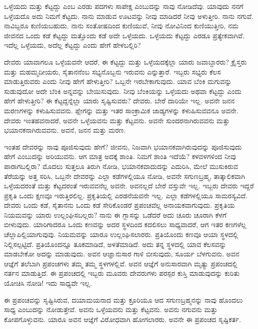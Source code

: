 ಒಳ್ಳೆಯದು ಮತ್ತು ಕೆಟ್ಟದ್ದು ಎಂಬ ಎರಡು ಪದಗಳು ಸಾಪೇಕ್ಷ ಎಂಬುದನ್ನು ನಾವು ನೋಡಿದೆವು. ಯಾವುದು ನನಗೆ ಒಳ್ಳೆಯದೊ ಅದು ನಿಮಗೆ ಕೆಟ್ಟದು. ನಾನು ಮಾಡುವ ಊಟವನ್ನು ನೀವು ಮಾಡಿದರೆ ನೀವು ಅಳುತ್ತೀರಿ. ನಾನು ನಗುವೆ. ನಾವಿಬ್ಬರೂ ಕುಣಿಯಬಹುದು. ನಾನು ಸಂತೋಷದಿಂದ ಕುಣಿಯುವೆ, ನೀವು ನೋವಿನಿಂದ ಕುಣಿಯುತ್ತೀರಿ, ನಮ ಜೀವನದ ಒಂದು ಕಡೆ ಕೆಟ್ಟದ್ದು ಮತ್ತೊಂದು ಕಡೆ ಅದೇ ಒಳ್ಳೆಯದು. ಒಳ್ಳೆಯದು ಕೆಟ್ಟದ್ದು ಎರಡೂ ಪ್ರತ್ಯೇಕವಾಗಿವೆ. ಇದೆಲ್ಲ ಒಳ್ಳೆಯದು, ಅದೆಲ್ಲ ಕೆಟ್ಟದ್ದು ಎಂದು ಹೇಗೆ ಹೇಳಬಲ್ಲಿರಿ?

ದೇವರು ಯಾವಾಗಲೂ ಒಳ್ಳೆಯವನೇ ಆದರೆ, ಈ ಕೆಟ್ಟದ್ದು ಮತ್ತು ಒಳ್ಳೆಯದಕ್ಕೆಲ್ಲಾ ಯಾರು ಜವಾಬ್ದಾರರು? ಕ್ರೈಸ್ತರು ಮತ್ತು ಮಹಮ್ಮದೀಯರು, ಸೈತಾನನೆಂಬ ಸಭ್ಯನೊಬ್ಬನು ಇರುವನು ಎನ್ನುತ್ತಾರೆ. ಇಬ್ಬರು ಸಭ್ಯರು ಕೆಲಸ ಮಾಡುತ್ತಿರುವರು ಎಂದು ನೀವು ಹೇಗೆ ಹೇಳುತ್ತೀರಿ? ಒಬ್ಬನೇ ಇರಬೇಕಾಗುವುದು. ಯಾವ ಬೆಂಕಿ ಮಗುವನ್ನು ಸುಡುವುದೋ ಅದೇ ಬೆಂಕಿ ಅನ್ನವನ್ನು ಬೇಯಿಸುವುದು. ನೀವು ಬೆಂಕಿಯನ್ನು ಒಳ್ಳೆಯದು ಅಥವಾ ಕೆಟ್ಟದ್ದು ಎಂದು ಹೇಗೆ ಹೇಳುತ್ತೀರಿ? ಈ ಕೆಟ್ಟದ್ದನ್ನೆಲ್ಲಾ ಯಾರು ಸೃಷ್ಟಿಸುವರು? ದೇವರು. ಬೇರೆ ದಾರಿಯೇ ಇಲ್ಲ. ಅವನೇ ಜನನ ಮರಣಗಳನ್ನು ಕಳುಹಿಸುವವನು. ಪ್ಲೇಗನ್ನು ಮತ್ತು ಇತರ ಸಾಂಕ್ರಾಮಿಕ ಜಾಡ್ಯಗಳನ್ನು ಕಳುಹಿಸುವವನೂ ಅವನೇ. ದೇವರು ಇಂತಹವನಾದರೆ, ಅವನೇ ಒಳ್ಳೆಯವನು ಮತ್ತು ಕೆಟ್ಟವನು. ಅವನೇ ಸುಂದರನಾಗಿರುವವನು ಮತ್ತು ಭಯಾನಕನಾಗಿರುವವನು. ಅವನೆ, ಜನನ ಮತ್ತು ಮರಣ.

ಇಂತಹ ದೇವರನ್ನು ನಾವು ಪೂಜಿಸುವುದು ಹೇಗೆ? ಜೀವನು, ನಿಜವಾಗಿ ಭಯಾನಕವಾಗಿರುವುದನ್ನು ಪೂಜಿಸುವುದು ಹೇಗೆ ಎಂಬುದನ್ನು ಅರಿಯುವನು. ಆಗ ಮಾತ್ರ ಅದಕ್ಕೆ ಶಾಂತಿ. ನಿಮಗೆ ಶಾಂತಿ ಇದೆಯೆ? ಕಳವಳಗಳಿಂದ ನೀವು ಪಾರಾಗಬಲ್ಲಿರಾ? ಮೊದಲು ಸುತ್ತಲೂ ತಿರುಗಿ ನೋಡಿ, ಭಯಾನಕವಾದುದನ್ನು ಎದುರಿಸಿ, ಮೇಲೆ ಮುಸುಕಿರುವ ತೆರೆಯನ್ನು ಅತ್ತ ಸರಿಸಿ, ಒಬ್ಬನೇ ದೇವರನ್ನು ಎಲ್ಲಾ ಕಡೆಗಳಲ್ಲಿಯೂ ನೋಡಿ, ಅವನೇ ಸಗುಣಬ್ರಹ್ಮ, ತಾತ್ಕಾಲಿಕವಾಗಿ ಒಳ್ಳೆಯದರಂತೆ ಮತ್ತು ಕೆಟ್ಟದರಂತೆ ಇರುವವನೆಲ್ಲ ಅವನೇ. ಅವನಲ್ಲದೆ ಬೇರೆ ವಸ್ತುವೇ ಇಲ್ಲ. ಇಬ್ಬರು ದೇವರು ಇದ್ದರೆ ಪ್ರಕೃತಿ ಒಂದು ಕ್ಷಣವೂ ಇರುತ್ತಿರಲಿಲ್ಲ. ಪ್ರಕೃತಿಯಲ್ಲಿ ಎರಡನೆಯವನೇ ಇಲ್ಲ. ಎಲ್ಲಾ ಕಡೆಗಳಲ್ಲಿಯೂ ಸಾಮರಸ್ಯವಿದೆ. ದೇವರು ಒಂದು ಕಡೆ, ಸೈತಾನನು ಒಂದು ಕಡೆ ಸೇರಿಕೊಂಡರೆ ಪ್ರಪಂಚವೆಲ್ಲ ಅನಾಯಕವಾಗುವುದು. ಪ್ರಕೃತಿಯ ನಿಯಮವನ್ನು ಯಾರು ಉಲ್ಲಂಘಿಸಬಲ್ಲರು? ನಾನು ಈ ಗ್ಲಾಸನ್ನು ಒಡೆದರೆ ಅದು ಚೂರು ಚೂರಾಗಿ ಕೆಳಗೆ ಬೀಳುವುದು. ಯಾರಿಗಾದರೂ ಒಂದು ಕಣವನ್ನು ಅದರ ಸ್ಥಳದಿಂದ ಕದಲಿಸಲು ಸಾಧ್ಯವಾದರೆ, ಆಗ ಇತರ ಕಣಗಳೆಲ್ಲ ಚೆಲ್ಲಾಪಿಲ್ಲಿಯಾಗುವುವು. ನಿಯಮವನ್ನು ಯಾರೂ ಉಲ್ಲಂಘಿಸಲಾರರು. ಪ್ರತಿಯೊಂದು ಕಣವೂ ಆಯಾ ಸ್ಥಳದಲ್ಲಿ ನಿಲ್ಲಿಸಲ್ಪಟ್ಟಿದೆ. ಪ್ರತಿಯೊಂದನ್ನೂ ತೂಕಮಾಡಿದೆ, ಅಳತೆಮಾಡಿದೆ. ಅದು ತನ್ನ ಸ್ಥಳದಲ್ಲಿ ಯಾವ ಕೆಲಸವನ್ನು ಮಾಡಬೇಕೋ ಅದನ್ನು ಮಾಡುವುದು. ಅವನ ಆಜ್ಞಾನುಸಾರ ಗಾಳಿ ಬೀಸುವುದು, ಸೂರ್ಯ ಬೆಳಗುವನು. ಅವನ ಆಜ್ಞೆಗೆ ತಲೆಬಾಗಿ ಪ್ರಪಂಚಗಳು ತಮ್ಮ ತಮ್ಮ ಸ್ಥಳಗಳಲ್ಲಿವೆ. ಅವನ ಆಜ್ಞೆಗೆ ಅನುಸಾರವಾಗಿ ಮೃತ್ಯು ಪ್ರಪಂಚದಲ್ಲಿ ನರ್ತನ ಮಾಡುತ್ತಿದೆ. ಈ ಪ್ರಪಂಚದಲ್ಲಿ ಇಬ್ಬರು ಮೂವರು ದೇವರುಗಳು ಪರಸ್ಪರ ಕುಸ್ತಿ ಮಾಡುವುದನ್ನು ಕುರಿತು ಯೋಚಿಸಿ ನೋಡಿ! ಇದು ಸಾಧ್ಯವೇ ಇಲ್ಲ.

ಈ ಪ್ರಪಂಚವನ್ನು ಸೃಷ್ಟಿಸಿರುವ, ದಯಾಮಯನಾದ ಮತ್ತು ಕ್ರೂರಿಯೂ ಆದ ಸಗುಣಬ್ರಹ್ಮನನ್ನು ನಾವು ಹೊಂದಲು ಸಾಧ್ಯ ಎಂಬುದನ್ನು ನೋಡುತ್ತೇವೆ. ಅವನು ಒಳ್ಳೆಯವನು ಮತ್ತು ಕೆಟ್ಟವನು. ಅವನು ನಗುವನು ಮತ್ತು ಕೋಪಗೊಳ್ಳುವನು. ಯಾರೂ ಅವನ ಆಜ್ಞೆಗೆ ವಿರೋಧವಾಗಿ ಹೋಗಲಾರರು. ಅವನೇ ಈ ಪ್ರಪಂಚದ ಸೃಷ್ಟಿಕರ್ತ.

